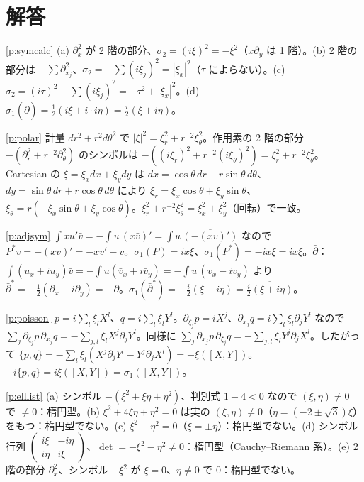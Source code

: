 
\section*{解答}
\begin{sol}{\ref{p:symcalc}}
(a) $\partial_x^2$ が 2 階の部分、$\sigma_2=(i\xi)^2=-\xi^2$（$x\partial_y$ は 1 階）。(b) 2 階の部分は $-\sum\partial_{x_j}^2$、$\sigma_2=-\sum(i\xi_j)^2=|\xi_x|^2$（$\tau$ によらない）。(c) $\sigma_2=(i\tau)^2-\sum(i\xi_j)^2=-\tau^2+|\xi_x|^2$。(d) $\sigma_1(\bar\partial)=\frac12(i\xi+i\cdot i\eta)=\frac i2(\xi+i\eta)$。
\end{sol}
\begin{sol}{\ref{p:polar}}
計量 $dr^2+r^2d\theta^2$ で $|\xi|^2=\xi_r^2+r^{-2}\xi_\theta^2$。作用素の 2 階の部分 $-(\partial_r^2+r^{-2}\partial_\theta^2)$ のシンボルは $-((i\xi_r)^2+r^{-2}(i\xi_\theta)^2)=\xi_r^2+r^{-2}\xi_\theta^2$。Cartesian の $\xi=\xi_xdx+\xi_ydy$ は $dx=\cos\theta\,dr-r\sin\theta\,d\theta$、$dy=\sin\theta\,dr+r\cos\theta\,d\theta$ により $\xi_r=\xi_x\cos\theta+\xi_y\sin\theta$、$\xi_\theta=r(-\xi_x\sin\theta+\xi_y\cos\theta)$。$\xi_r^2+r^{-2}\xi_\theta^2=\xi_x^2+\xi_y^2$（回転）で一致。
\end{sol}
\begin{sol}{\ref{p:adjsym}}
$\int xu'\bar v=-\int u\,(x\bar v)'=\int u\,\overline{(-(xv)')}$ なので $P^*v=-(xv)'=-xv'-v$。$\sigma_1(P)=ix\xi$、$\sigma_1(P^*)=-ix\xi=\overline{ix\xi}$。$\bar\partial$：$\int(u_x+iu_y)\bar v=-\int u(\bar v_x+i\bar v_y)=-\int u\,\overline{(v_x-iv_y)}$ より $\bar\partial^*=-\frac12(\partial_x-i\partial_y)=-\partial$。$\sigma_1(\bar\partial^*)=-\frac i2(\xi-i\eta)=\overline{\frac i2(\xi+i\eta)}$。
\end{sol}
\begin{sol}{\ref{p:poisson}}
$p=i\sum_l\xi_lX^l$、$q=i\sum_l\xi_lY^l$。$\partial_{\xi_j}p=iX^j$、$\partial_{x_j}q=i\sum_l\xi_l\partial_jY^l$ なので $\sum_j\partial_{\xi_j}p\,\partial_{x_j}q=-\sum_{j,l}\xi_lX^j\partial_jY^l$。同様に $\sum_j\partial_{x_j}p\,\partial_{\xi_j}q=-\sum_{j,l}\xi_lY^j\partial_jX^l$。したがって $\{p,q\}=-\sum_l\xi_l(X^j\partial_jY^l-Y^j\partial_jX^l)=-\xi([X,Y])$。$-i\{p,q\}=i\xi([X,Y])=\sigma_1([X,Y])$。
\end{sol}
\begin{sol}{\ref{p:elllist}}
(a) シンボル $-(\xi^2+\xi\eta+\eta^2)$、判別式 $1-4<0$ なので $(\xi,\eta)\ne0$ で $\ne0$：楕円型。(b) $\xi^2+4\xi\eta+\eta^2=0$ は実の $(\xi,\eta)\neq0$（$\eta=(-2\pm\sqrt3)\xi$）をもつ：楕円型でない。(c) $\xi^2-\eta^2=0$（$\xi=\pm\eta$）：楕円型でない。(d) シンボル行列 $\begin{pmatrix}i\xi&-i\eta\\i\eta&i\xi\end{pmatrix}$、$\det=-\xi^2-\eta^2\ne0$：楕円型（Cauchy--Riemann 系）。(e) 2 階の部分 $\partial_x^2$、シンボル $-\xi^2$ が $\xi=0$、$\eta\ne0$ で $0$：楕円型でない。
\end{sol}
